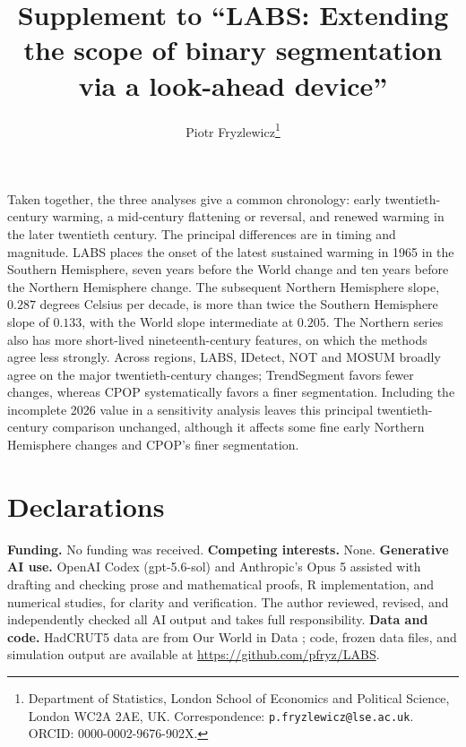 \documentclass[12pt, a4paper]{article}
\begin{document}
Taken together, the three analyses give a common chronology: early
twentieth-century warming, a mid-century flattening or reversal, and renewed
warming in the later twentieth century.  The principal differences are in
timing and magnitude.  LABS places the onset of the latest sustained warming
in 1965 in the Southern Hemisphere, seven years before the World change and
ten years before the Northern Hemisphere change.  The subsequent Northern
Hemisphere slope, $0.287$ degrees Celsius per decade, is more than twice the
Southern Hemisphere slope of $0.133$, with the World slope intermediate at
$0.205$.  The Northern series also has more short-lived nineteenth-century
features, on which the methods agree less strongly.  Across regions, LABS,
IDetect, NOT and MOSUM broadly agree on the major twentieth-century changes;
TrendSegment favors fewer changes, whereas CPOP systematically favors a
finer segmentation.  Including the incomplete 2026 value in a sensitivity
analysis leaves this principal twentieth-century comparison unchanged,
although it affects some fine early Northern Hemisphere changes and CPOP's
finer segmentation.


\section*{Declarations}
\textbf{Funding.} No funding was received. \textbf{Competing interests.} None. \textbf{Generative AI use.} OpenAI Codex (gpt-5.6-sol) and Anthropic's Opus 5 assisted with drafting and checking prose and mathematical proofs, R implementation, and numerical studies, for clarity and verification. The author reviewed, revised, and independently checked all AI output and takes full responsibility. \textbf{Data and code.} HadCRUT5 data are from Our World in Data \citep{owidtemp}; code, frozen data files, and simulation output are available at \url{https://github.com/pfryz/LABS}.

\clearpage
\setcounter{section}{0}
\setcounter{equation}{0}
\setcounter{algorithm}{0}
\renewcommand{\thesection}{S\arabic{section}}
\renewcommand{\theequation}{S\arabic{equation}}
\renewcommand{\thealgorithm}{S\arabic{algorithm}}
\renewcommand{\theHsection}{S.\arabic{section}}
\renewcommand{\theHequation}{S.\arabic{equation}}
\renewcommand{\theHalgorithm}{S.\arabic{algorithm}}



\title{Supplement to ``LABS: Extending the scope of binary segmentation via a look-ahead device''} 
\author{Piotr Fryzlewicz\thanks{Department of Statistics, London School of Economics and Political Science, London WC2A 2AE, UK. Correspondence: \texttt{p.fryzlewicz@lse.ac.uk}. ORCID: 0000-0002-9676-902X.}}
\date{}
\maketitle
\end{document}
